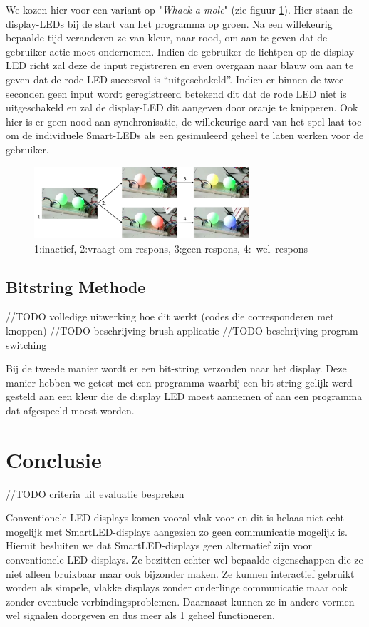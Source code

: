 \documentclass{article}
\begin{document}
We kozen hier voor een variant op "\textit{Whack-a-mole}" (zie figuur \ref{fig:mole}). Hier staan de display-LEDs bij de start van het programma op groen. Na een willekeurig bepaalde tijd veranderen ze van kleur, naar rood, om aan te geven dat de gebruiker actie moet ondernemen. Indien de gebruiker de lichtpen op de display-LED richt zal deze de input registreren en even overgaan naar blauw om aan te geven dat de rode LED succesvol is “uitgeschakeld”. Indien er binnen de twee seconden geen input wordt geregistreerd betekend dit dat de rode LED niet is uitgeschakeld en zal de display-LED dit aangeven door oranje te knipperen.  
Ook hier is er geen nood aan synchronisatie, de willekeurige aard van het spel laat toe om de individuele Smart-LEDs als een gesimuleerd geheel te laten werken voor de gebruiker.


\begin{figure}[H]
\centering
\includegraphics[width=8cm]{moleSequence.png}
\caption{1:inactief, 2:vraagt om respons, 3:geen respons, \mbox{4: wel respons}}
\label{fig:mole}
\end{figure}

\subsection{Bitstring Methode}

//TODO volledige uitwerking hoe dit werkt (codes die corresponderen met knoppen)
//TODO beschrijving brush applicatie
//TODO beschrijving program switching



Bij de tweede manier wordt er een bit-string verzonden naar het display. Deze manier hebben we getest met een programma waarbij een bit-string gelijk werd gesteld aan een kleur die de display LED moest aannemen of aan een programma dat afgespeeld moest worden.


\section{Conclusie}
//TODO criteria uit evaluatie bespreken

Conventionele LED-displays komen vooral vlak voor en dit is helaas niet echt mogelijk met SmartLED-displays aangezien zo geen communicatie mogelijk is. Hieruit besluiten we dat SmartLED-displays geen alternatief zijn voor conventionele LED-displays. Ze bezitten echter wel bepaalde eigenschappen die ze niet alleen bruikbaar maar ook bijzonder maken. Ze kunnen interactief gebruikt worden als simpele, vlakke displays zonder onderlinge communicatie maar ook zonder eventuele verbindingsproblemen. Daarnaast kunnen ze in andere vormen wel signalen doorgeven en dus meer als 1 geheel functioneren.
\end{document}
